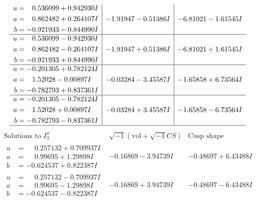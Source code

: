 \documentclass[1p]{elsarticle_modified}
\theoremstyle{definition}
\newcommand{\I}{\sqrt{-1}}
\begin{document}
$$\begin{array}{c|c|c}
\begin{aligned}
u &= \phantom{-}0.536099 + 0.942930 I \\
a &= \phantom{-}0.862482 + 0.264107 I \\
b &= -0.921933 - 0.844990 I\end{aligned}
 & -1.91947 - 0.51386 I & -6.81021 - 1.61545 I \\ \hline\begin{aligned}
u &= \phantom{-}0.536099 - 0.942930 I \\
a &= \phantom{-}0.862482 - 0.264107 I \\
b &= -0.921933 + 0.844990 I\end{aligned}
 & -1.91947 + 0.51386 I & -6.81021 + 1.61545 I \\ \hline\begin{aligned}
u &= -0.201305 + 0.782124 I \\
a &= \phantom{-}1.52028 - 0.00897 I \\
b &= -0.782793 + 0.837361 I\end{aligned}
 & -0.03284 - 3.45587 I & -1.65858 + 6.73564 I \\ \hline\begin{aligned}
u &= -0.201305 - 0.782124 I \\
a &= \phantom{-}1.52028 + 0.00897 I \\
b &= -0.782793 - 0.837361 I\end{aligned}
 & -0.03284 + 3.45587 I & -1.65858 - 6.73564 I\\
 \hline 
 \end{array}$$\newpage$$\begin{array}{c|c|c}  
\text{Solutions to }I^u_{3}& \I (\text{vol} + \sqrt{-1}CS) & \text{Cusp shape}\\
 \hline 
\begin{aligned}
u &= \phantom{-}0.257132 + 0.709937 I \\
a &= \phantom{-}0.99695 + 1.29898 I \\
b &= -0.624537 + 0.822387 I\end{aligned}
 & -0.16869 - 3.94739 I & -0.48697 + 6.43488 I \\ \hline\begin{aligned}
u &= \phantom{-}0.257132 - 0.709937 I \\
a &= \phantom{-}0.99695 - 1.29898 I \\
b &= -0.624537 - 0.822387 I\end{aligned}
 & -0.16869 + 3.94739 I & -0.48697 - 6.43488 I \\ \hline\begin{aligned}

\end{aligned}
\end{array}$$
\end{document}
